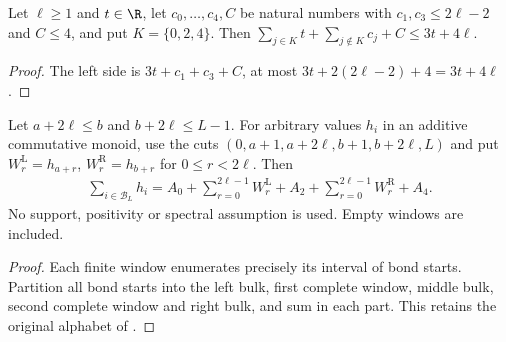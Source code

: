 \begin{lemma}
    \label{thm:five_region_independent_budget}
    \leanok
    Let $\ell\ge1$ and $t\in\R$, let $c_0,\ldots,c_4,C$ be natural numbers with
    $c_1,c_3\le2\ell-2$ and $C\le4$, and put $K=\{0,2,4\}$.
    Then $\sum_{j\in K}t+\sum_{j\notin K}c_j+C\le3t+4\ell$.
\end{lemma}
\begin{proof}
    \leanok
    The left side is $3t+c_1+c_3+C$, at most
    $3t+2(2\ell-2)+4=3t+4\ell$.
\end{proof}

\begin{lemma}
    \label{thm:actual_two_window_alphabet_sum}
    \leanok
    Let $a+2\ell\le b$ and $b+2\ell\le L-1$.
    For arbitrary values $h_i$ in an additive commutative monoid, use the
    cuts $(0,a+1,a+2\ell,b+1,b+2\ell,L)$ and put
    $W_r^{\mathrm L}=h_{a+r}$, $W_r^{\mathrm R}=h_{b+r}$ for $0\le r<2\ell$.
    Then
    \begin{align}
        \sum_{i\in\mathcal B_L}h_i
        =A_0+\sum_{r=0}^{2\ell-1}W_r^{\mathrm L}
        +A_2+\sum_{r=0}^{2\ell-1}W_r^{\mathrm R}+A_4.
    \end{align}
    No support, positivity or spectral assumption is used. Empty windows
    are included.
\end{lemma}
\begin{proof}
    \leanok
    Each finite window enumerates precisely its interval of bond starts.
    Partition all bond starts into the left bulk, first complete window,
    middle bulk, second complete window and right bulk, and sum in each part.
    This retains the original alphabet of
    \cite[eq:H-mid-cut, lines 810--821]{Arad2016RigorousRG}.
\end{proof}
